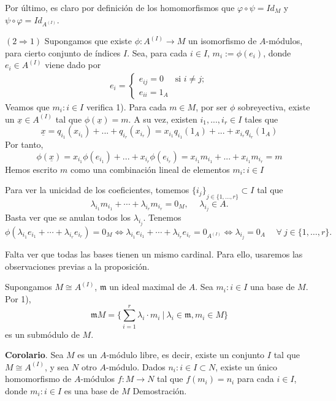 \documentclass[a4paper,12pt]{article}
\begin{document}
Por último, es claro por definición de los homomorfismos que $\varphi\circ\psi=Id_{M}$ y $\psi\circ\varphi=Id_{A^{(I)}}$.

$(2\Rightarrow 1)$ Supongamos que existe $\phi: A^{(I)}\rightarrow M$ un isomorfismo de $A$-módulos, para cierto conjunto de índices $I$. Sea, para cada $i\in I$, $m_i:=\phi(e_i)$, donde $e_i\in A^{(I)}$ viene dado por
$$\begin{array}{rccl}
    e_i= \left\{ \begin{array}{ll}
         e_{ij}=0 & \mbox{si $i\neq j$};\\
         e_{ii}=1_A & \mbox{}\end{array} \right.
\end{array}$$
Veamos que ${m_i:i\in I}$ verifica 1). Para cada $m\in M$, por ser $\phi$ sobreyectiva, existe un $\underline{x}\in A^{(I)}$ tal que $\phi(\underline{x})=m$. A su vez, existen $i_1,...,i_r\in I$ tales que
$$\underline{x}=q_{i_1}(x_{i_1})+...+q_{i_r}(x_{i_r})=x_{i_1}q_{i_1}(1_A)+...+x_{i_r}q_{i_r}(1_A)$$
Por tanto,
$$\phi(\underline{x})=x_{i_1}\phi(e_{i_1})+...+x_{i_r}\phi(e_{i_r})=x_{i_1}m_{i_1}+...+x_{i_1}m_{i_r}=m$$
Hemos escrito $m$ como una combinación lineal de elementos ${m_i:i\in I}$

Para ver la unicidad de los coeficientes, tomemos ${\{i_j\}}_{j\in\{1,\dots,r\}}\subset I$ tal que$$\lambda_{i_1}m_{i_1}+\cdots+\lambda_{i_r}m_{i_r}=0_M,\hspace{15pt}\lambda_{i_j}\in A.$$
Basta ver que se anulan todos los $\lambda_{i_j}$. Tenemos
$$\phi(\lambda_{i_1}e_{i_1}+\cdots+\lambda_{i_r}e_{i_r})=0_M\Longleftrightarrow\lambda_{i_1}e_{i_1}+\cdots+\lambda_{i_r}e_{i_r}=0_{A^{(I)}}\Longleftrightarrow\lambda_{i_j}=0_A\hspace{15pt}\forall\ j\in\{1,\dots,r\}.$$

Falta ver que todas las bases tienen un mismo cardinal. Para ello, usaremos las observaciones previas a la proposición.

Supongamos $M\cong A^{(I)}$, $\mathfrak{m}$ un ideal maximal de $A$. Sea ${m_i:i\in I}$ una base de $M$. Por 1), $$\mathfrak{m}M=\{\sum_{i=1}^r \lambda_i\cdot m_i\ |\  \lambda_i\in \mathfrak{m}, m_i\in M\}$$
es un submódulo de $M$.

\textbf{Corolario}. Sea $M$ es un $A$-módulo libre, es decir, existe un conjunto $I$ tal que $M\cong A^{(I)}$, y sea $N$ otro $A$-módulo. Dados ${n_i:i\in I}\subset N$, existe un único homomorfismo de $A$-módulos $f:M\rightarrow N$ tal que $f(m_i)=n_i$ para cada $i\in I$, donde ${m_i: i\in I}$ es una base de $M$
Demostración. 
\end{document}
